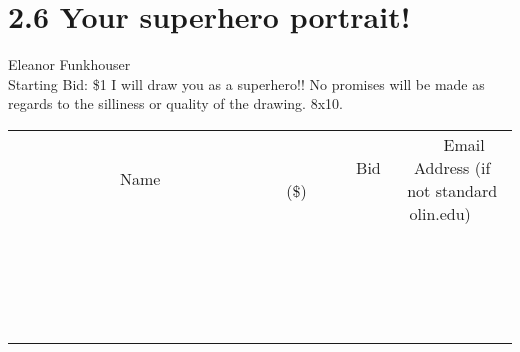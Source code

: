 \documentclass[11pt]{article}
\begin{document}
\section*{2.6 Your superhero portrait!}
Eleanor Funkhouser
\\
Starting Bid: \$1
\newline
I will draw you as a superhero!! No promises will be made as regards to the silliness or quality of the drawing. 8x10.
\\[3ex]
\begin{tabular}{c c c}
~~~~~~~~~~~~~Name~~~~~~~~~~~~~ & ~~~~~~~~~Bid (\$)~~~~~~~~~  & ~~~Email Address (if not standard olin.edu)~~~\\
 & & \\
\hline
 & & \\
\hline
 & & \\
\hline
 & & \\
\hline
 & & \\
\hline
 & & \\
\hline
 & & \\
\hline
 & & \\
\hline
 & & \\
\hline
 & & \\
\hline
 & & \\
\hline
 & & \\
\hline
 & & \\
\hline
 & & \\
\hline
 & & \\
\hline
 & & \\
\hline
 & & \\
\hline
 & & \\
\hline
 & & \\
\hline
\end{tabular}
\newpage
\end{document}
